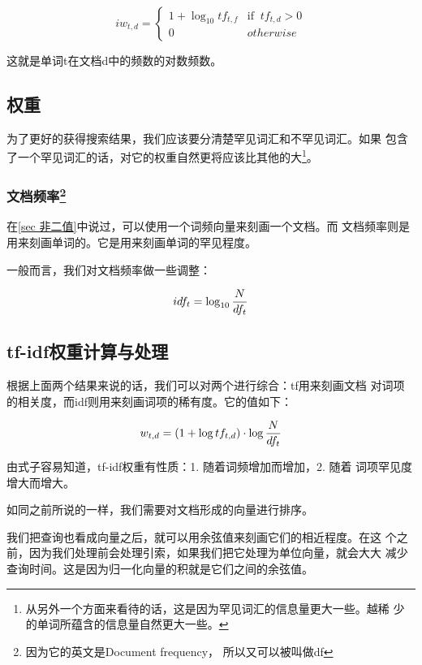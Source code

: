\def\tif{\text{if }}

$$iw_{t,d} = \left\{\begin{array}{ll}
    1+\log_{10}tf_{t,f} & \tif\ tf_{t,d}>0  \\
    0 & otherwise \end{array} \right.$$

这就是单词t在文档d中的频数的对数频数。

\subsection{权重}

为了更好的获得搜索结果，我们应该要分清楚罕见词汇和不罕见词汇。如果
包含了一个罕见词汇的话，对它的权重自然更将应该比其他的大\footnote{%
从另外一个方面来看待的话，这是因为罕见词汇的信息量更大一些。越稀
少的单词所蕴含的信息量自然更大一些。}。

\subsubsection{文档频率\footnote{因为它的英文是Document frequency，
所以又可以被叫做df}}

在\ref{sec 非二值}中说过，可以使用一个词频向量来刻画一个文档。而
文档频率则是用来刻画单词的。它是用来刻画单词的罕见程度。

一般而言，我们对文档频率做一些调整：

$$idf_t = \log_{10}{N \over df_t}$$

\subsection{tf-idf权重计算与处理}

根据上面两个结果来说的话，我们可以对两个进行综合：tf用来刻画文档
对词项的相关度，而idf则用来刻画词项的稀有度。它的值如下：

$$w_{t,d} = (1+\log tf_{t,d})\cdot\log{N\over df_t}$$

由式子容易知道，tf-idf权重有性质：1. 随着词频增加而增加，2. 随着
词项罕见度增大而增大。

如同之前所说的一样，我们需要对文档形成的向量进行排序。

我们把查询也看成向量之后，就可以用余弦值来刻画它们的相近程度。在这
个之前，因为我们处理前会处理引索，如果我们把它处理为单位向量，就会大大
减少查询时间。这是因为归一化向量的积就是它们之间的余弦值。


